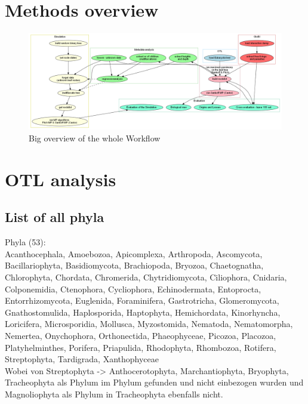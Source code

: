   \section{Methods overview}
    \begin{figure}[h!]
      \centering
      \includegraphics[width=\textwidth]{Figures/Workflow.png}
      \caption{Big overview of the whole Workflow}
      \label{fig:BigWorkflow}
    \end{figure}

  \section{OTL analysis}\label{sec:otl analysis}

    \subsection{List of all phyla}\label{subsec:listPhyla}

    Phyla (53): \\
    Acanthocephala, Amoebozoa, Apicomplexa, Arthropoda, Ascomycota, Bacillariophyta, Basidiomycota, 
      Brachiopoda, Bryozoa, Chaetognatha, Chlorophyta, Chordata, Chromerida, Chytridiomycota, 
      Ciliophora, Cnidaria, Colponemidia, Ctenophora, Cycliophora, Echinodermata, Entoprocta, 
      Entorrhizomycota, Euglenida, Foraminifera, Gastrotricha, Glomeromycota, Gnathostomulida, 
      Haplosporida, Haptophyta, Hemichordata, Kinorhyncha, Loricifera, Microsporidia, Mollusca, 
      Myzostomida, Nematoda, Nematomorpha, Nemertea, Onychophora, Orthonectida, Phaeophyceae, 
      Picozoa, Placozoa, Platyhelminthes, Porifera, Priapulida, Rhodophyta, Rhombozoa, Rotifera, 
      Streptophyta, Tardigrada, Xanthophyceae \\
    Wobei von Streptophyta -> Anthocerotophyta, Marchantiophyta, Bryophyta, Tracheophyta als
      Phylum im Phylum gefunden und nicht einbezogen wurden und Magnoliophyta als Phylum in 
      Tracheophyta ebenfalls nicht. \\

